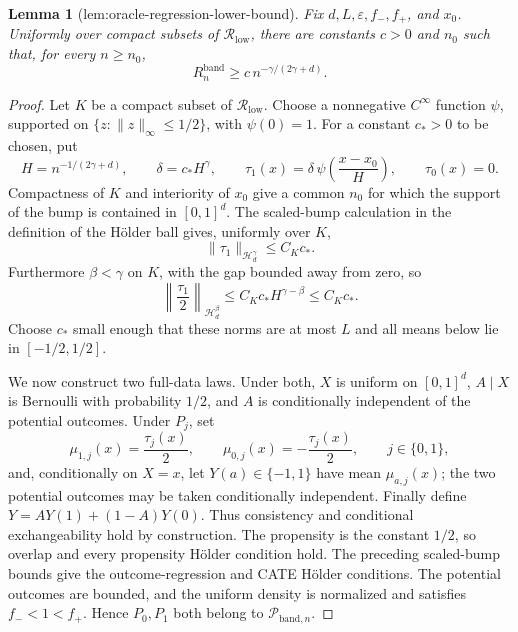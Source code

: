 \documentclass{article}
\newtheorem{lemma}{Lemma}
\begin{document}
\begin{lemma}[lem:oracle-regression-lower-bound]\label{lem:oracle-regression-lower-bound}
Fix \(d,L,\varepsilon,f_-,f_+\), and \(x_0\).  Uniformly over compact
subsets of \(\mathcal R_{\mathrm{low}}\), there are constants \(c>0\) and
\(n_0\) such that, for every \(n\geq n_0\),
\[
R_n^{\mathrm{band}}\geq c\,n^{-\gamma/(2\gamma+d)}.
\]
\end{lemma}
\begin{proof}
Let \(K\) be a compact subset of \(\mathcal R_{\mathrm{low}}\).  Choose a
nonnegative \(C^\infty\) function \(\psi\), supported on
\(\{z:\lVert z\rVert_\infty\leq1/2\}\), with \(\psi(0)=1\).  For a constant
\(c_*>0\) to be chosen, put
\[
H=n^{-1/(2\gamma+d)},\qquad
\delta=c_*H^\gamma,\qquad
\tau_1(x)=\delta\,\psi\!\left(\frac{x-x_0}{H}\right),\qquad
\tau_0(x)=0.
\]
Compactness of \(K\) and interiority of \(x_0\) give a common \(n_0\) for
which the support of the bump is contained in \([0,1]^d\).  The scaled-bump
calculation in the definition of the H\"older ball gives, uniformly over
\(K\),
\[
\lVert\tau_1\rVert_{\mathcal H^\gamma_d}\leq C_Kc_*.
\]
Furthermore \(\beta<\gamma\) on \(K\), with the gap bounded away from zero,
so
\[
\left\lVert\frac{\tau_1}{2}\right\rVert_{\mathcal H^\beta_d}
\leq C_Kc_*H^{\gamma-\beta}\leq C_Kc_*.
\]
Choose \(c_*\) small enough that these norms are at most \(L\) and all means
below lie in \([-1/2,1/2]\).

We now construct two full-data laws.  Under both, \(X\) is uniform on
\([0,1]^d\), \(A\mid X\) is Bernoulli with probability \(1/2\), and \(A\) is
conditionally independent of the potential outcomes.  Under \(P_j\), set
\[
\mu_{1,j}(x)=\frac{\tau_j(x)}2,\qquad
\mu_{0,j}(x)=-\frac{\tau_j(x)}2,\qquad j\in\{0,1\},
\]
and, conditionally on \(X=x\), let \(Y(a)\in\{-1,1\}\) have mean
\(\mu_{a,j}(x)\); the two potential outcomes may be taken conditionally
independent.  Finally define \(Y=AY(1)+(1-A)Y(0)\).  Thus consistency and
conditional exchangeability hold by construction.  The propensity is the
constant \(1/2\), so overlap and every propensity H\"older condition hold.
The preceding scaled-bump bounds give the outcome-regression and CATE
H\"older conditions.  The potential outcomes are bounded, and the uniform
density is normalized and satisfies \(f_-<1<f_+\).  Hence \(P_0,P_1\) both
belong to \(\mathcal P_{\mathrm{band},n}\).


\end{proof}
\end{document}
